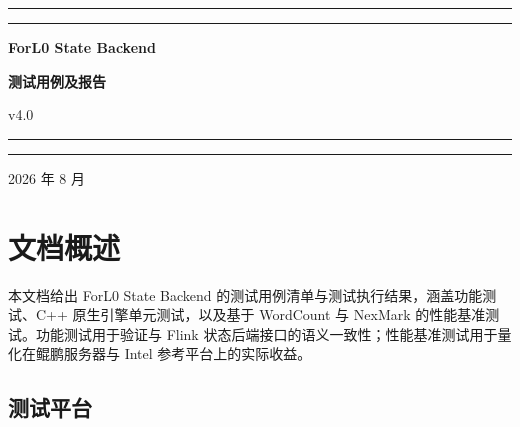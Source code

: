 \documentclass[a4paper,11pt]{article}
\newcommand{\project}{ForL0 State Backend}
\newcommand{\coverrule}{{\color{accent}\rule{\linewidth}{0.9pt}}}
\newcommand{\coverrulethin}{{\color{accent!55}\rule{\linewidth}{0.3pt}}}
\begin{document}
\begin{titlepage}
\thispagestyle{empty}
\centering
\vspace*{5.5cm}

\coverrule
\vspace{2pt}
\coverrulethin

\vspace{1.6cm}
{\sffamily\huge\bfseries\color{accent} \project\par}
\vspace{0.8cm}
{\sffamily\LARGE\bfseries 测试用例及报告\par}

\vspace{0.6cm}
{\sffamily\large v4.0\par}

\vspace{1.6cm}
\coverrulethin
\vspace{2pt}
\coverrule

\vfill

{\sffamily\large\color{accent!85} 2026 年 8 月\par}

\vspace{1.2cm}
\end{titlepage}

\pagestyle{plain}
\tableofcontents
\clearpage
{}
\setcounter{page}{1}
\pagestyle{fancy}

\section{文档概述}

本文档给出 \project{} 的测试用例清单与测试执行结果，涵盖功能测试、C++ 原生引擎单元测试，以及基于 WordCount 与 NexMark 的性能基准测试。功能测试用于验证与 Flink 状态后端接口的语义一致性；性能基准测试用于量化在鲲鹏服务器与 Intel 参考平台上的实际收益。

\subsection{测试平台}
\end{document}
